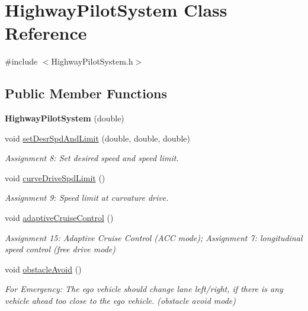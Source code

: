 \hypertarget{class_highway_pilot_system}{}\section{Highway\+Pilot\+System Class Reference}
\label{class_highway_pilot_system}


{\ttfamily \#include $<$Highway\+Pilot\+System.\+h$>$}

\subsection*{Public Member Functions}
\begin{DoxyCompactItemize}
\item 
\mbox{\label{class_highway_pilot_system_a41959a32b44b7b6f23a6d80db8675673}} 
{\bfseries Highway\+Pilot\+System} (double)
\item 
void \mbox{\hyperlink{class_highway_pilot_system_ab6808b1cd4ee579cad41199254607d6f}{set\+Desr\+Spd\+And\+Limit}} (double, double, double)
\begin{DoxyCompactList}\small\item\em Assignment 8\+: Set desired speed and speed limit. \end{DoxyCompactList}\item 
void \mbox{\hyperlink{class_highway_pilot_system_a3e1d73612c21401dc3657f33025694ae}{curve\+Drive\+Spd\+Limit}} ()
\begin{DoxyCompactList}\small\item\em Assignment 9\+: Speed limit at curvature drive. \end{DoxyCompactList}\item 
void \mbox{\hyperlink{class_highway_pilot_system_a8a0b3e790d26f76eeb74586f3d6aeeac}{adaptive\+Cruise\+Control}} ()
\begin{DoxyCompactList}\small\item\em Assignment 15\+: Adaptive Cruise Control (A\+CC mode); Assignment 7\+: longitudinal speed control (free drive mode) \end{DoxyCompactList}\item 
void \mbox{\hyperlink{class_highway_pilot_system_ac51c432bb5f88a17494a61271ff83960}{obstacle\+Avoid}} ()
\begin{DoxyCompactList}\small\item\em For Emergency\+: The ego vehicle should change lane left/right, if there is any vehicle ahead too close to the ego vehicle. (obstacle avoid mode) \end{DoxyCompactList}\item 

\end{DoxyCompactItemize}
